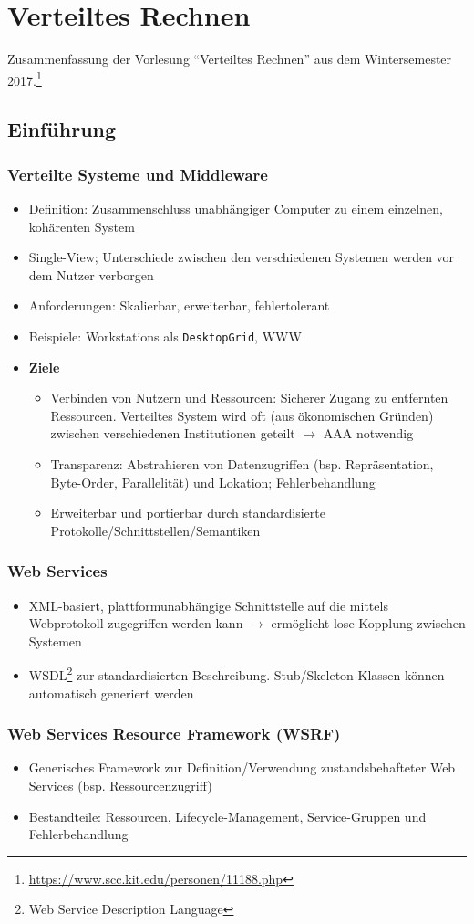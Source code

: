 \chapter{Verteiltes Rechnen}

Zusammenfassung der Vorlesung "`Verteiltes Rechnen"' aus dem Wintersemester 2017.\footnote{\url{https://www.scc.kit.edu/personen/11188.php}}

\section{Einführung}

\subsection{Verteilte Systeme und Middleware}
\begin{itemize}
	\item Definition: Zusammenschluss unabhängiger Computer zu einem einzelnen, kohärenten System
	\item Single-View; Unterschiede zwischen den verschiedenen Systemen werden vor dem Nutzer verborgen
	\item Anforderungen: Skalierbar, erweiterbar, fehlertolerant
	\item Beispiele: Workstations als \texttt{DesktopGrid}, WWW
	\item \textbf{Ziele}
	\begin{itemize}
		\item Verbinden von Nutzern und Ressourcen: Sicherer Zugang zu entfernten Ressourcen. Verteiltes System wird oft (aus ökonomischen Gründen) zwischen verschiedenen Institutionen geteilt \(\rightarrow\) AAA notwendig
		\item Transparenz: Abstrahieren von Datenzugriffen (bsp. Repräsentation, Byte-Order, Parallelität) und Lokation; Fehlerbehandlung
		\item Erweiterbar und portierbar durch standardisierte Protokolle/Schnittstellen/Semantiken
	\end{itemize}
\end{itemize}


\subsection{Web Services}
\begin{itemize}
	\item XML-basiert, plattformunabhängige Schnittstelle auf die mittels Webprotokoll zugegriffen werden kann \(\rightarrow\) ermöglicht lose Kopplung zwischen Systemen
	\item WSDL\footnote{Web Service Description Language} zur standardisierten Beschreibung. Stub/Skeleton-Klassen können automatisch generiert werden
\end{itemize}


\subsection{Web Services Resource Framework (WSRF)}
\begin{itemize}
	\item Generisches Framework zur Definition/Verwendung zustandsbehafteter Web Services (bsp. Ressourcenzugriff)
	\item Bestandteile: Ressourcen, Lifecycle-Management, Service-Gruppen und Fehlerbehandlung
\end{itemize}